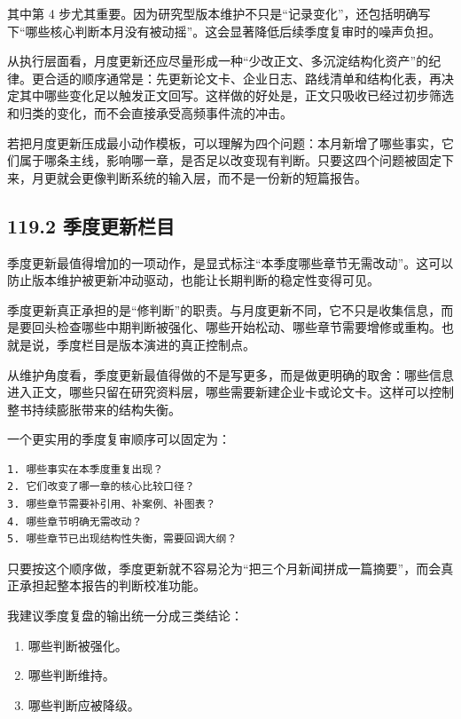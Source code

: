 其中第 4 步尤其重要。因为研究型版本维护不只是“记录变化”，还包括明确写下“哪些核心判断本月没有被动摇”。这会显著降低后续季度复审时的噪声负担。

从执行层面看，月度更新还应尽量形成一种“少改正文、多沉淀结构化资产”的纪律。更合适的顺序通常是：先更新论文卡、企业日志、路线清单和结构化表，再决定其中哪些变化足以触发正文回写。这样做的好处是，正文只吸收已经过初步筛选和归类的变化，而不会直接承受高频事件流的冲击。

若把月度更新压成最小动作模板，可以理解为四个问题：本月新增了哪些事实，它们属于哪条主线，影响哪一章，是否足以改变现有判断。只要这四个问题被固定下来，月更就会更像判断系统的输入层，而不是一份新的短篇报告。

\subsection*{119.2 季度更新栏目}


季度更新最值得增加的一项动作，是显式标注“本季度哪些章节无需改动”。这可以防止版本维护被更新冲动驱动，也能让长期判断的稳定性变得可见。

季度更新真正承担的是“修判断”的职责。与月度更新不同，它不只是收集信息，而是要回头检查哪些中期判断被强化、哪些开始松动、哪些章节需要增修或重构。也就是说，季度栏目是版本演进的真正控制点。

从维护角度看，季度更新最值得做的不是写更多，而是做更明确的取舍：哪些信息进入正文，哪些只留在研究资料层，哪些需要新建企业卡或论文卡。这样可以控制整书持续膨胀带来的结构失衡。

一个更实用的季度复审顺序可以固定为：

\begin{lstlisting}
1. 哪些事实在本季度重复出现？
2. 它们改变了哪一章的核心比较口径？
3. 哪些章节需要补引用、补案例、补图表？
4. 哪些章节明确无需改动？
5. 哪些章节已出现结构性失衡，需要回调大纲？
\end{lstlisting}

只要按这个顺序做，季度更新就不容易沦为“把三个月新闻拼成一篇摘要”，而会真正承担起整本报告的判断校准功能。

我建议季度复盘的输出统一分成三类结论：

\begin{enumerate}
\item 哪些判断被强化。
\item 哪些判断维持。
\item 哪些判断应被降级。
\end{enumerate}

